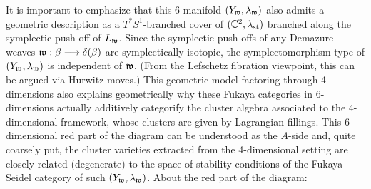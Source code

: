 It is important to emphasize that this 6-manifold $(Y_{\mathfrak{w}},\lambda_{\mathfrak{w}})$ also admits a geometric description as a $T^*S^1$-branched cover of $(\mathbb{C}^2,\lambda_{\text{st}})$ branched along the symplectic push-off of $L_{\mathfrak{w}}$. Since the symplectic push-offs of any Demazure weaves $\mathfrak{w}:\beta\longrightarrow\delta(\beta)$ are symplectically isotopic, the symplectomorphism type of $(Y_{\mathfrak{w}},\lambda_{\mathfrak{w}})$ is independent of $\mathfrak{w}$. (From the Lefschetz fibration viewpoint, this can be argued via Hurwitz moves.) This geometric model factoring through 4-dimensions also explains geometrically why these Fukaya categories in 6-dimensions actually additively categorify the cluster algebra associated to the 4-dimensional framework, whose clusters are given by Lagrangian fillings. This 6-dimensional red part of the diagram can be understood as the $A$-side and, quite coarsely put, the cluster varieties extracted from the 4-dimensional setting are closely related (degenerate) to the space of stability conditions of the Fukaya-Seidel category of such $(Y_{\mathfrak{w}},\lambda_{\mathfrak{w}})$. About the red part of the diagram:\\

